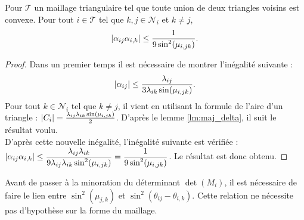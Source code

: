 \documentclass[12pt,a4paper]{article}
\begin{document}
	\begin{lm}\label{lm:majoration_produit_alpha}
			Pour $\mathcal T$ un maillage triangulaire tel que toute union de deux triangles voisins est convexe. Pour tout $i \in \mathcal T$ tel que $k,j \in \mathcal N_i$ et $k \not = j$,
		\begin{equation}
			\left\lvert \alpha_{ij}\alpha_{i,k} \right\rvert \leq \dfrac{1}{9\sin^2(\mu_{i,jk})}.
		\end{equation}
	\end{lm}
	\begin{proof}
		Dans un premier temps il est nécessaire de montrer l'inégalité suivante :
		\begin{equation}
			\left\lvert \alpha_{ij} \right\rvert \leq \dfrac{\lambda_{ij}}{3\lambda_{ik}\sin(\mu_{i,jk})}.
		\end{equation}
		Pour tout $k \in \mathcal N_i$ tel que $k \not = j$, il vient en utilisant la formule de l'aire d'un triangle : $\left\lvert C_i \right\rvert = \frac{\lambda_{ij}\lambda_{ik}\sin(\mu_{i,jk})}2$. D'après le lemme \ref{lm:maj_delta}, il suit le résultat voulu.\\
		D'après cette nouvelle inégalité, l'inégalité suivante est vérifiée : $\left\lvert \alpha_{ij}\alpha_{i,k} \right\rvert \leq \dfrac{\lambda_{ij}\lambda_{ik}}{9\lambda_{ij}\lambda_{ik}\sin^2(\mu_{i,jk})} = \dfrac1{9\sin^2(\mu_{i,jk})}$. Le résultat est donc obtenu.
	\end{proof}
	
	\newcommand{\Ap}{\mathrm{Angle}^+}
	\newcommand{\Am}{\mathrm{Angle}^-}
	
	Avant de passer à la minoration du déterminant $\det(M_i)$, il est nécessaire de faire le lien entre $\sin^2(\mu_{j,k})$ et $\sin^2(\theta_{ij}-\theta_{i,k})$. Cette relation ne nécessite pas d'hypothèse sur la forme du maillage.
	
\end{document}
